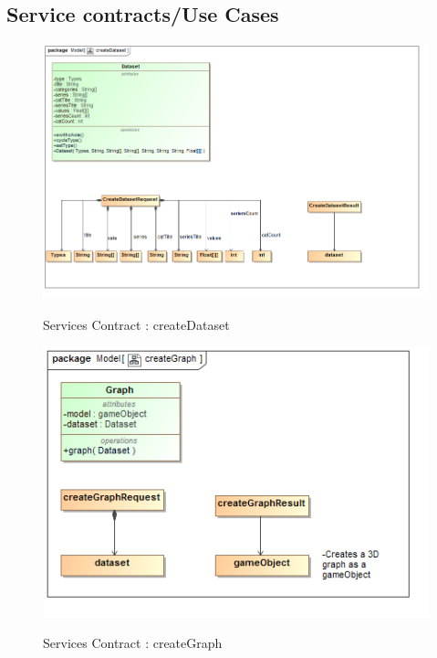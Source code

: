 \documentclass[a4paper,12pt]{article}
\begin{document}
\subsection{Service contracts/Use Cases}
	\begin{figure}[H]
		\includegraphics[width=\textwidth]{Images/createDataset.png}  \\
		\caption{Services Contract : createDataset}
	\end{figure}
	\begin{figure}[H]
		\includegraphics[width=\textwidth]{Images/createGraph.png}  \\
		\caption{Services Contract : createGraph}
	\end{figure}
\end{document}
